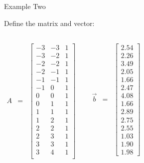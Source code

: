 \documentclass[svgnames,table,,aspectratio=169]{beamer}
\newcommand{\columnVector}[1]{%
  \left[
    \begin{array}{r}
    #1                           
    \end{array}
  \right]
}
\begin{document}
\begin{frame}{Example Two}

  Define the matrix and vector:
  \begin{columns}
  \begin{eqnarray*}
    A & = & 
    \left[
    \begin{array}{rrr}
      -3 & -3 & 1 \\
      -3 & -2 & 1 \\
      -2 & -2 & 1 \\
      -2 & -1 & 1 \\
      -1 & -1 & 1 \\
      -1 &  0 & 1 \\
       0 &  0 & 1 \\
       0 &  1 & 1 \\
       1 &  1 & 1 \\
       1 &  2 & 1 \\
       2 &  2 & 1 \\
       2 &  3 & 1 \\
       3 &  3 & 1 \\
       3 &  4 & 1 \\
    \end{array}
    \right]
  \end{eqnarray*}

  \begin{eqnarray*}
    \vec{b} & = &  \columnVector{2.54 \\ 2.26 \\ 3.49 \\ 2.05 \\ 1.66 \\ 2.47 \\ 4.08 \\
                  1.66 \\ 2.89 \\ 2.75 \\ 2.55 \\ 1.03 \\ 1.90 \\ 1.98 }
  \end{eqnarray*}

\end{columns}
\end{frame}
\end{document}
